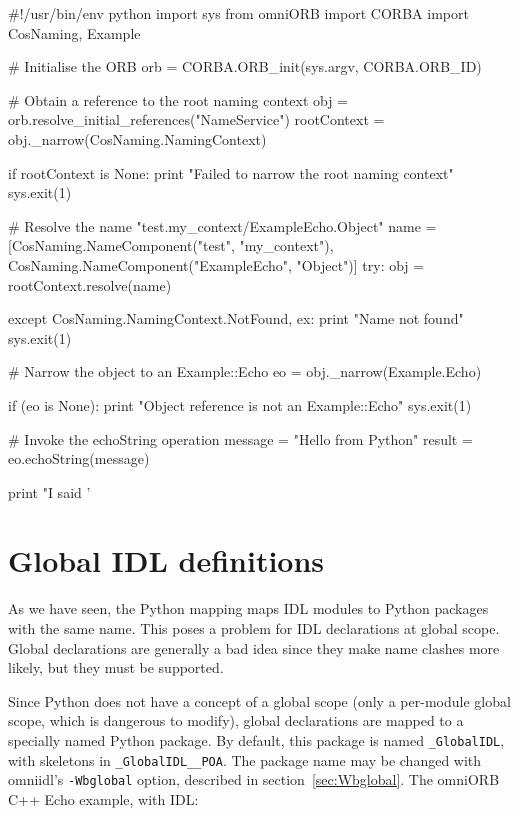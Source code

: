 \documentclass[11pt,twoside,a4paper]{book}
\newcommand{\module}[1]{\texttt{#1}}
\newcommand{\cmdline}[1]{\texttt{#1}}
\begin{document}
\begin{pylisting}
#!/usr/bin/env python
import sys
from omniORB import CORBA
import CosNaming, Example

# Initialise the ORB
orb = CORBA.ORB_init(sys.argv, CORBA.ORB_ID)

# Obtain a reference to the root naming context
obj         = orb.resolve_initial_references("NameService")
rootContext = obj._narrow(CosNaming.NamingContext)

if rootContext is None:
    print "Failed to narrow the root naming context"
    sys.exit(1)

# Resolve the name "test.my_context/ExampleEcho.Object"
name = [CosNaming.NameComponent("test", "my_context"),
        CosNaming.NameComponent("ExampleEcho", "Object")]
try:
    obj = rootContext.resolve(name)

except CosNaming.NamingContext.NotFound, ex:
    print "Name not found"
    sys.exit(1)

# Narrow the object to an Example::Echo
eo = obj._narrow(Example.Echo)

if (eo is None):
    print "Object reference is not an Example::Echo"
    sys.exit(1)

# Invoke the echoString operation
message = "Hello from Python"
result  = eo.echoString(message)

print "I said '%
\end{pylisting}




\section{Global IDL definitions}
\label{sec:globalIDL}

As we have seen, the Python mapping maps IDL modules to Python
packages with the same name. This poses a problem for IDL declarations
at global scope. Global declarations are generally a bad idea since
they make name clashes more likely, but they must be supported.

Since Python does not have a concept of a global scope (only a
per-module global scope, which is dangerous to modify), global
declarations are mapped to a specially named Python package. By
default, this package is named \module{\_GlobalIDL}, with skeletons in
\module{\_GlobalIDL\_\_POA}. The package name may be changed with
omniidl's \cmdline{-Wbglobal} option, described in
section~\ref{sec:Wbglobal}. The omniORB C++ Echo example, with IDL:
\end{document}
